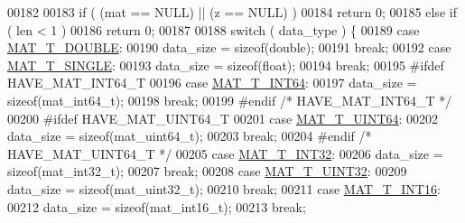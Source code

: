 \begin{DoxyCode}
{{{{00182 
00183     \textcolor{keywordflow}{if} ( (mat == NULL) || (z == NULL) )
00184         \textcolor{keywordflow}{return} 0;
00185     \textcolor{keywordflow}{else} \textcolor{keywordflow}{if} ( len < 1 )
00186         \textcolor{keywordflow}{return} 0;
00187 
00188     \textcolor{keywordflow}{switch} ( data\_type ) \{
00189         \textcolor{keywordflow}{case} \hyperlink{group___m_a_t_ggacf7b3b879282b7ab3a51190e49bf3453a31e721ecf7e188196f83c32838288797}{MAT\_T\_DOUBLE}:
00190             data\_size = \textcolor{keyword}{sizeof}(double);
00191             \textcolor{keywordflow}{break};
00192         \textcolor{keywordflow}{case} \hyperlink{group___m_a_t_ggacf7b3b879282b7ab3a51190e49bf3453a3a3657d40e9212c923d9b9d03531b64c}{MAT\_T\_SINGLE}:
00193             data\_size = \textcolor{keyword}{sizeof}(float);
00194             \textcolor{keywordflow}{break};
00195 \textcolor{preprocessor}{#ifdef HAVE\_MAT\_INT64\_T}
00196         \textcolor{keywordflow}{case} \hyperlink{group___m_a_t_ggacf7b3b879282b7ab3a51190e49bf3453a9e825b5d18b8f946eaf2b4b57e51c145}{MAT\_T\_INT64}:
00197             data\_size = \textcolor{keyword}{sizeof}(mat\_int64\_t);
00198             \textcolor{keywordflow}{break};
00199 \textcolor{preprocessor}{#endif }\textcolor{comment}{/* HAVE\_MAT\_INT64\_T */}\textcolor{preprocessor}{}
00200 \textcolor{preprocessor}{#ifdef HAVE\_MAT\_UINT64\_T}
00201         \textcolor{keywordflow}{case} \hyperlink{group___m_a_t_ggacf7b3b879282b7ab3a51190e49bf3453a45547932c46be27118abe08302d7e29f}{MAT\_T\_UINT64}:
00202             data\_size = \textcolor{keyword}{sizeof}(mat\_uint64\_t);
00203             \textcolor{keywordflow}{break};
00204 \textcolor{preprocessor}{#endif }\textcolor{comment}{/* HAVE\_MAT\_UINT64\_T */}\textcolor{preprocessor}{}
00205         \textcolor{keywordflow}{case} \hyperlink{group___m_a_t_ggacf7b3b879282b7ab3a51190e49bf3453a83e06a68320726c6572bfbb9f3addb1d}{MAT\_T\_INT32}:
00206             data\_size = \textcolor{keyword}{sizeof}(mat\_int32\_t);
00207             \textcolor{keywordflow}{break};
00208         \textcolor{keywordflow}{case} \hyperlink{group___m_a_t_ggacf7b3b879282b7ab3a51190e49bf3453aa397e285a23fe240368b752897652c6a}{MAT\_T\_UINT32}:
00209             data\_size = \textcolor{keyword}{sizeof}(mat\_uint32\_t);
00210             \textcolor{keywordflow}{break};
00211         \textcolor{keywordflow}{case} \hyperlink{group___m_a_t_ggacf7b3b879282b7ab3a51190e49bf3453a8c5b2e381946e95ea8d81ac216743302}{MAT\_T\_INT16}:
00212             data\_size = \textcolor{keyword}{sizeof}(mat\_int16\_t);
00213             \textcolor{keywordflow}{break};
}}}}
\end{DoxyCode}
